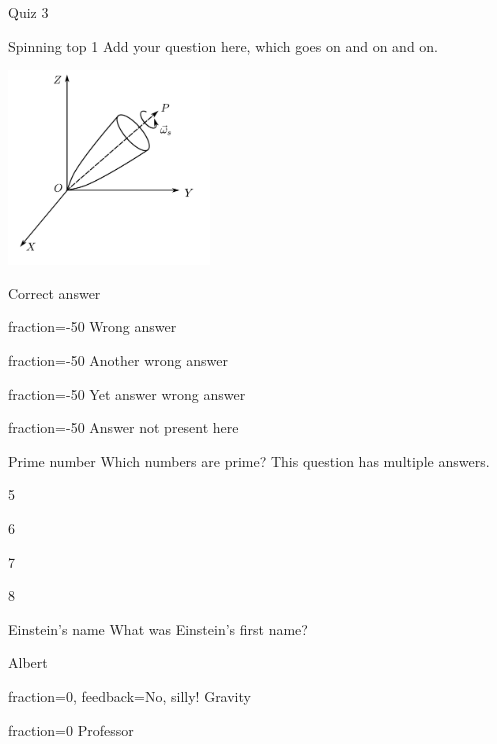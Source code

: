 \documentclass[12pt]{article}
\begin{document}
\begin{quiz}{Quiz 3}  


\begin{multi}[points=3]{Spinning top 1}
%
Add your question here, which goes on and on and on.

\includegraphics[width=0.4\textwidth]{spinning_top1}
%
\item* Correct answer 
\item[fraction=-50] Wrong answer  
\item[fraction=-50] Another wrong answer
\item[fraction=-50] Yet answer wrong answer
\item[fraction=-50] Answer not present here
\end{multi}
%

\begin{multi}[multiple]{Prime number}
Which numbers are prime? This question has multiple answers.
\item* 5   %
\item 6
\item* 7   %
\item 8
\end{multi}

\begin{shortanswer}[case sensitive=true]{Einstein's name}
What was Einstein's first name?
\item Albert
\item[fraction=0, feedback={No, silly!}] Gravity
\item[fraction=0] Professor
\end{shortanswer}


%


\end{quiz}
\end{document}
